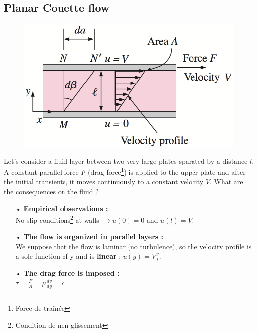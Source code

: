 \subsection{Planar Couette flow}
	\begin{figure}
	\vspace{-5mm}
	\includegraphics[scale=0.4]{ch1/6}
	\end{figure}
	Let's consider a fluid layer between two very large plates sparated by a distance $l$. A constant parallel force $F$ (drag force\footnote{Force de traînée}) is applied to the upper plate and after the initial transients, it moves continuously to a constant velocity $V$. What are the consequences on the fluid ? \\
	
	\begin{itemize}
		\item[•] \textbf{Empirical observations : }\\
		No slip conditions\footnote{Condition de non-glissement} at walls $\rightarrow u(0) = 0$ and $u(l) = V$. \\
		\item[•] \textbf{The flow is organized in parallel layers :}\\
		We suppose that the flow is laminar (no turbulence), so the velocity profile is a sole function of y and is \textbf{linear} : $u(y) = V\frac{y}{l}$.\\
		\item[•] \textbf{The drag force is imposed :} \\
			$\tau = \frac{F}{A} = \mu \frac{dv}{dy} = c$
	\end{itemize}
	
	\newpage
	
